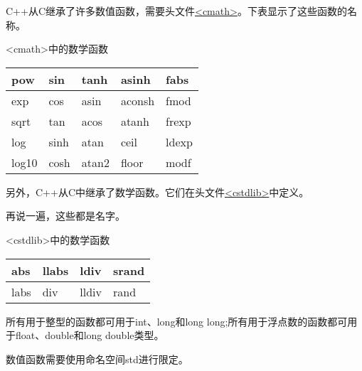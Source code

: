C++从C继承了许多数值函数，需要头文件\href{http://en.cppreference.com/w/cpp/numeric/math}{<cmath>}。下表显示了这些函数的名称。

\begin{center}
<cmath>中的数学函数
\end{center}

\begin{longtable}[c]{lllll}
pow   & sin  & tanh  & asinh  & fabs  \\
\endfirsthead
%
\endhead
%
exp   & cos  & asin  & aconsh & fmod  \\
sqrt  & tan  & acos  & atanh  & frexp \\
log   & sinh & atan  & ceil   & ldexp \\
log10 & cosh & atan2 & floor  & modf 
\end{longtable}

另外，C++从C中继承了数学函数。它们在头文件\href{http://en.cppreference.com/w/cpp/numeric/math}{<cstdlib>}中定义。

再说一遍，这些都是名字。

\begin{center}
<cstdlib>中的数学函数
\end{center}

\begin{longtable}[c]{llll}
abs  & llabs & ldiv  & srand \\
\endfirsthead
%
\endhead
%
labs & div   & lldiv & rand 
\end{longtable}

所有用于整型的函数都可用于int、long和long long;所有用于浮点数的函数都可用于float、double和long double类型。

数值函数需要使用命名空间std进行限定。


